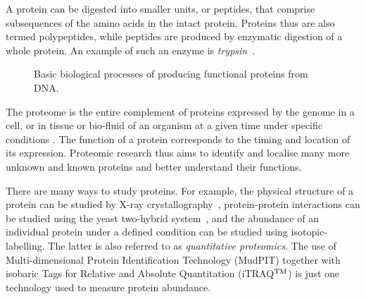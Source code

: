 \documentclass[11pt,a4paper]{article}
\begin{document}
A protein can be digested into smaller units, or peptides, that comprise subsequences of the amino acids in the intact protein. Proteins thus are also termed polypeptides, while peptides are produced by enzymatic digestion of a whole protein. An example of such an enzyme is \emph{trypsin}~\citep{Eidhammer2008}. 

\begin{figure}[hbt]
\caption{Basic biological processes of producing functional proteins from DNA.}
\label{fig:processes}
\end{figure}

The proteome is the entire complement of proteins expressed by the genome in a cell, or in tissue or bio-fluid of an organism at a given time under specific conditions \citep{Boehm2007}. The function of a protein corresponds to the timing and location of its expression. Proteomic research thus aims to identify and localise many more unknown and known proteins and better understand their functions. 

There are many ways to study proteins. For example, the physical structure of a protein can be studied by X-ray crystallography~\citep{Blow2002}, protein-protein interactions can be studied using the yeast two-hybrid system~\citep{Fields1989}, and the abundance of an individual protein under a defined condition can be studied using isotopic-labelling. The latter is also referred to as \emph{quantitative proteomics}. The use of Multi-dimensional Protein Identification Technology (MudPIT) together with isobaric Tags for Relative and Absolute Quantitation (iTRAQ$^{\rm TM}$) is just one technology used to measure protein abundance.  
\end{document}
